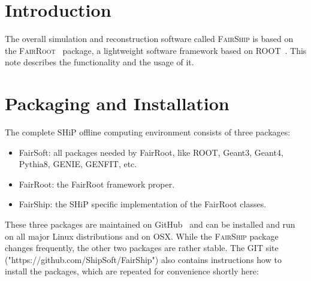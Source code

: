 \documentclass[12pt,a4paper]{article}
\begin{document}
\section{Introduction}
\label{sec:intro}
%
The overall simulation and reconstruction software called \textsc{FairShip} is based on the \textsc{FairRoot}~\cite{AlTurany:2012gc} package, a lightweight software framework based on ROOT~\cite{root}. This note describes the functionality and the usage of it. 

\section{Packaging and Installation}
\label{sec:Installation}
The complete SHiP offline computing environment consists of three packages:
\begin{itemize}
   \item FairSoft: all packages needed by FairRoot, like ROOT, Geant3, Geant4, Pythia8, GENIE, GENFIT, etc.
   \item FairRoot: the FairRoot framework proper.
   \item FairShip: the SHiP specific implementation of the FairRoot classes.
\end{itemize}
These three packages are maintained on GitHub~\cite{computing:github} and can be installed and run on all major Linux distributions and on OSX. While the \textsc{FairShip} package changes frequently, the other two packages are rather stable. The GIT site ("https://github.com/ShipSoft/FairShip") also contains instructions how to install the packages, which are repeated for convenience shortly here:
\end{document}
